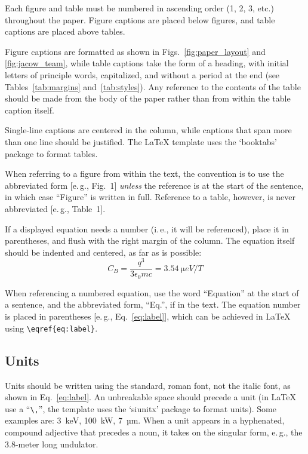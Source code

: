 \documentclass[letterpaper,
               nospread,     %
               ]{jacow}
\begin{document}
Each figure and table must be numbered in ascending
order (1, 2, 3, etc.) throughout the paper. 
Figure captions are placed below figures, and table
captions are placed above tables.

Figure captions are formatted as shown in Figs.~\ref{fig:paper_layout} and \ref{fig:jacow_team},
while table captions take the form of a heading,
with initial letters of principle words, capitalized, and
without a period at the end (see Tables~\ref{tab:margins} and~\ref{tab:styles}).
Any reference to the contents of the table should be made from
the body of the paper rather than from within the table
caption itself.

Single-line captions are centered in the column, while captions
that span more than one line should be justified.
The \LaTeX{} template uses the ‘booktabs’ package to
format tables. 

When referring to a figure from within the text, the
convention is to use the abbreviated form [e.\,g., Fig.~1]
\emph{unless} the reference is at the start of the sentence, in
which case “Figure” is written in full. Reference to a
table, however, is never abbreviated [e.\,g., Table~1].


If a displayed equation needs a number (i.\,e., it will be
referenced), place it in parentheses, and flush with the
right margin of the column. The equation itself should be
indented and centered, as far as is possible:
\begin{equation}\label{eq:label}
    C_B=\frac{q^3}{3\epsilon_{0} mc}=\SI{3.54}{\micro eV/T}
\end{equation}

When referencing a numbered equation, use the word
“Equation” at the start of a sentence, and the abbreviated
form, “Eq.”, if in the text. The equation number is placed
in parentheses [e.\,g., Eq.~\eqref{eq:label}], which can be 
achieved in \LaTeX{} using \verb|\eqref{eq:label}|.

\subsection{Units}
	
Units should be written using the standard, roman font,
not the italic font, as shown in Eq.~\eqref{eq:label}.
An unbreakable space should precede a unit (in \LaTeX{} use a “\verb|\,|”,
the template uses the ‘siunitx’ package to format units).
Some examples are: \SI{3}{keV},
\SI{100}{kW}, \SI{7}{µm}. When a unit appears in a hyphenated,
compound adjective that precedes a noun, it takes on the
singular form, e.\,g., the 3.8-meter long undulator.
\end{document}
